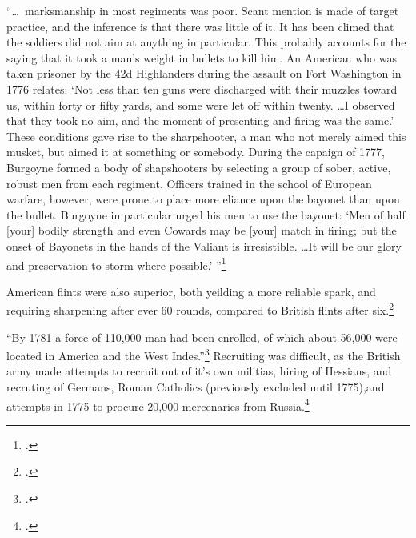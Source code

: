 
``\ldots~marksmanship in most regiments was poor. Scant mention is made of target
practice, and the inference is that there was little of it. It has been climed
that the soldiers did not aim at anything in particular. This probably accounts
for the saying that it took a man's weight in bullets to kill him. An American
who was taken prisoner by the 42d Highlanders during the assault on Fort
Washington in 1776 relates: `Not less than ten guns were discharged with their
muzzles toward us, within forty or fifty yards, and some were let off within
twenty. \ldots I observed that they took no aim, and the moment of presenting
and firing was the same.' These conditions gave rise to the sharpshooter, a man
who not merely aimed this musket, but aimed it at something or somebody. During
the capaign of 1777, Burgoyne formed a body of shapshooters by selecting a group
of sober, active, robust men from each regiment. Officers trained in the school
of European warfare, however, were prone to place more eliance upon the bayonet
than upon the bullet. Burgoyne in particular urged his men to use the bayonet:
`Men of half [your] bodily strength and even Cowards may be [your] match in
firing; but the onset of Bayonets in the hands of the Valiant is irresistible.
\ldots It will be our glory and preservation to storm where possible.'
''\footcite[20-21]{curtis_org_1972}

American flints were also superior, both yeilding a more reliable spark, and
requiring sharpening after ever 60 rounds, compared to British flints after
six.\footcite[21]{curtis_org_1972}


``By 1781 a force of 110,000 man had been enrolled, of which about 56,000 were
located in America and the West Indes.''\footcite[51]{curtis_org_1972} Recruiting
was difficult, as the British army made attempts to recruit out of it's own
militias, hiring of Hessians, and recruting of Germans, Roman Catholics
(previously excluded until 1775),and attempts in 1775 to procure 20,000
mercenaries from Russia.\footcite[52]{curtis_org_1972} 


